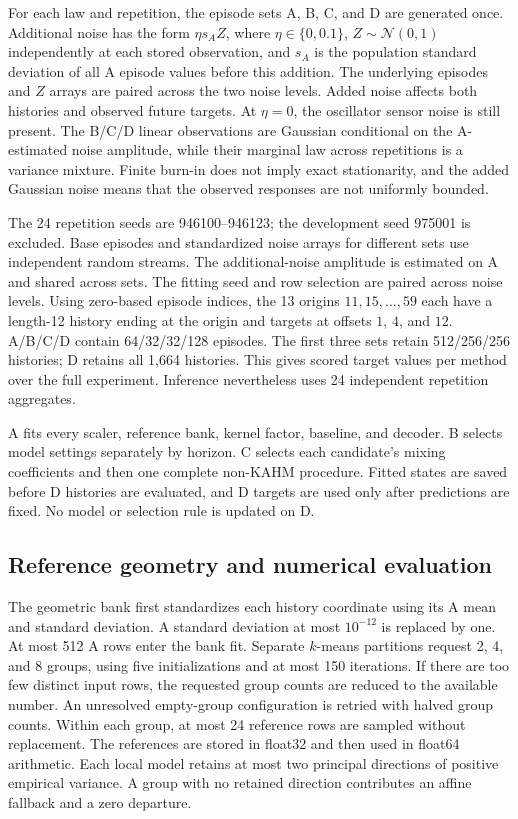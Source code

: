 For each law and repetition, the episode sets A, B, C, and D are generated
once. Additional noise has the form $\eta s_A Z$, where
$\eta\in\{0,0.1\}$, $Z\sim\mathcal N(0,1)$ independently at each
stored observation, and $s_A$ is the population standard deviation of
all A episode values before this addition. The underlying episodes and
$Z$ arrays are paired across the two noise levels. Added noise affects
both histories and observed future targets. At $\eta=0$, the oscillator
sensor noise is still present. The B/C/D linear observations are Gaussian
conditional on the A-estimated noise amplitude, while their marginal law
across repetitions is a variance mixture. Finite burn-in does not imply
exact stationarity, and the added Gaussian noise means that the observed
responses are not uniformly bounded.

The 24 repetition seeds are 946100--946123; the development seed 975001
is excluded. Base episodes and standardized noise arrays for different
sets use independent random streams. The additional-noise amplitude is
estimated on A and shared across sets. The fitting seed and row selection
are paired across noise levels. Using zero-based episode indices, the
13 origins $11,15,\ldots,59$ each have a length-12 history ending at the
origin and targets at offsets $1$, $4$, and $12$. A/B/C/D contain
64/32/32/128 episodes. The first three sets retain 512/256/256 histories;
D retains all 1,664 histories. This gives \RMTargetCells{} scored target
values per method over the full experiment. Inference nevertheless uses
24 independent repetition aggregates.

A fits every scaler, reference bank, kernel factor, baseline, and decoder.
B selects model settings separately by horizon. C selects each candidate's
mixing coefficients and then one complete non-KAHM procedure. Fitted
states are saved before D histories are evaluated, and D targets are
used only after predictions are fixed. No model or selection rule is
updated on D.

\subsection{Reference geometry and numerical evaluation}

The geometric bank first standardizes each history coordinate using its
A mean and standard deviation. A standard deviation at most $10^{-12}$
is replaced by one. At most 512 A rows enter the bank fit. Separate
$k$-means partitions request 2, 4, and 8 groups, using five initializations
and at most 150 iterations. If there are too few distinct input rows,
the requested group counts are reduced to the available number. An
unresolved empty-group configuration is retried with halved group counts.
Within each group, at most 24 reference rows are sampled without
replacement. The references are stored in float32 and then used in
float64 arithmetic. Each local model retains at most two principal
directions of positive empirical variance. A group with no retained
direction contributes an affine fallback and a zero departure.

